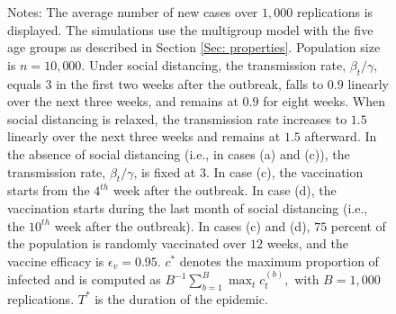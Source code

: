 \documentclass[12pt]{article}
\begin{document}
\begin{figure}[!htb]
\begin{center}
\begin{tabular}
{\includegraphics[
height=1.7781in,
width=2.3609in
]%
{figs/theory_multigroup_L5_dist_vacc_dcT_main.png}%
}
\\
$c^{\ast}=0.59$, $T^{\ast}=201$ days &  & $c^{\ast}=0.12$, $T^{\ast}=215$ days
\end{tabular}



\end{center}

%

\vspace{-0.3cm}
Notes: The average number of new cases over $1,000$ replications is displayed.
The simulations use the multigroup model with the five age groups as described
in Section \ref{Sec: properties}. Population size is $n=10,000$. Under social
distancing, the transmission rate, $\beta_{t}/\gamma$, equals $3$ in the first
two weeks after the outbreak, falls to $0.9$ linearly over the next three
weeks, and remains at $0.9$ for eight weeks. When social distancing is
relaxed, the transmission rate increases to $1.5$ linearly over the next three
weeks and remains at $1.5$ afterward. In the absence of social distancing
(i.e., in cases (a) and (c)), the transmission rate, $\beta_{t}/\gamma$, is
fixed at $3$. In case (c), the vaccination starts from the $4^{th}$ week after
the outbreak$.$ In case (d), the vaccination starts during the last month of
social distancing (i.e., the $10^{th}$ week after the outbreak). In cases (c)
and (d), $75$ percent of the population is randomly vaccinated over $12$
weeks, and the vaccine efficacy is $\epsilon_{v}=0.95$. $c^{\ast}$ denotes the
maximum proportion of infected and is computed as $B^{-1}\sum_{b=1}^{B}%
\max_{t}c_{t}^{(b)},$ with $B=1,000$ replications. $T^{\ast}$ is the duration
of the epidemic.%

\end{figure}%
\end{document}
